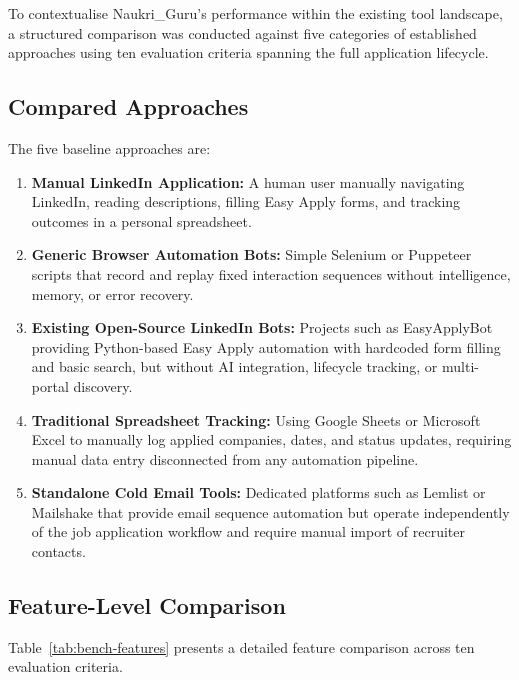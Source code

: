 \documentclass[12pt, a4paper, oneside]{report}
\begin{document}
To contextualise Naukri\_Guru's performance within the existing tool landscape, a structured comparison was conducted against five categories of established approaches using ten evaluation criteria spanning the full application lifecycle.

\subsection{Compared Approaches}

The five baseline approaches are:

\begin{enumerate}
    \item \textbf{Manual LinkedIn Application:} A human user manually navigating LinkedIn, reading descriptions, filling Easy Apply forms, and tracking outcomes in a personal spreadsheet.
    \item \textbf{Generic Browser Automation Bots:} Simple Selenium or Puppeteer scripts that record and replay fixed interaction sequences without intelligence, memory, or error recovery.
    \item \textbf{Existing Open-Source LinkedIn Bots:} Projects such as EasyApplyBot \cite{ref3} providing Python-based Easy Apply automation with hardcoded form filling and basic search, but without AI integration, lifecycle tracking, or multi-portal discovery.
    \item \textbf{Traditional Spreadsheet Tracking:} Using Google Sheets or Microsoft Excel to manually log applied companies, dates, and status updates, requiring manual data entry disconnected from any automation pipeline.
    \item \textbf{Standalone Cold Email Tools:} Dedicated platforms such as Lemlist or Mailshake that provide email sequence automation but operate independently of the job application workflow and require manual import of recruiter contacts.
\end{enumerate}

\subsection{Feature-Level Comparison}

Table~\ref{tab:bench-features} presents a detailed feature comparison across ten evaluation criteria.
\end{document}
